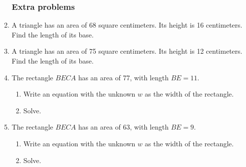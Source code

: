 \begin{enumerate}
\newpage
\subsubsection*{Extra problems}
\item A triangle has an area of 68 square centimeters. Its height is 16 centimeters. Find the length of its base. \vspace{2cm}

\item A triangle has an area of 75 square centimeters. Its height is 12 centimeters. Find the length of its base. \vspace{2cm}

\item The rectangle $BECA$ has an area of 77, with length $BE=11$.
  \begin{enumerate}
    \item Write an equation with the unknown $w$ as the width of the rectangle. 
    \item Solve.
  \end{enumerate}
  \begin{flushright}
  \end{flushright}

\item The rectangle $BECA$ has an area of 63, with length $BE=9$.
  \begin{enumerate}
    \item Write an equation with the unknown $w$ as the width of the rectangle. \par \medskip
    \item Solve.
  \end{enumerate}
  \begin{flushright}
  \end{flushright}


\end{enumerate}
